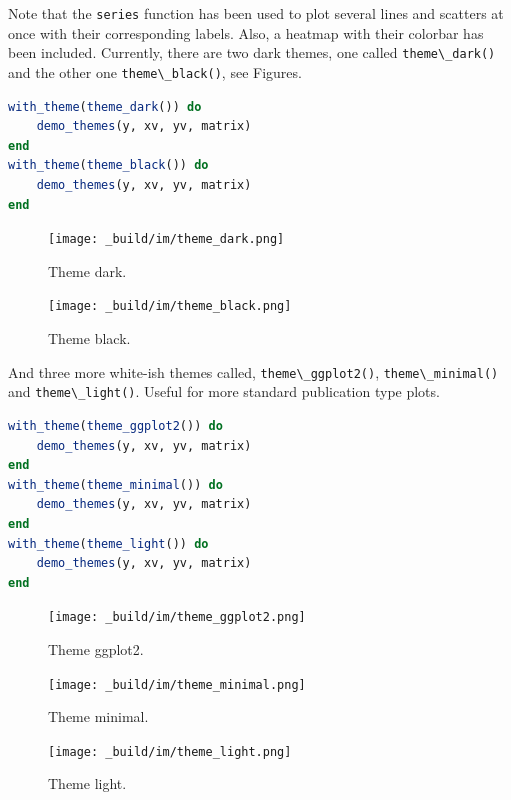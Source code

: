 \documentclass[
  notoc %
]{tufte-book}
\newcommand{\passthrough}[1]{#1}
\begin{document}
Note that the \passthrough{\lstinline!series!} function has been used to
plot several lines and scatters at once with their corresponding labels.
Also, a heatmap with their colorbar has been included. Currently, there
are two dark themes, one called \passthrough{\lstinline!theme\_dark()!}
and the other one \passthrough{\lstinline!theme\_black()!}, see Figures.

\begin{lstlisting}[language=Julia]
with_theme(theme_dark()) do
    demo_themes(y, xv, yv, matrix)
end
with_theme(theme_black()) do
    demo_themes(y, xv, yv, matrix)
end
\end{lstlisting}

\begin{figure}
\hypertarget{fig:theme_dark}{%
\centering
\texttt{[image: \_build/im/theme\_dark.png]}
\caption{Theme dark.}\label{fig:theme_dark}
}
\end{figure}

\begin{figure}
\hypertarget{fig:theme_black}{%
\centering
\texttt{[image: \_build/im/theme\_black.png]}
\caption{Theme black.}\label{fig:theme_black}
}
\end{figure}

And three more white-ish themes called,
\passthrough{\lstinline!theme\_ggplot2()!},
\passthrough{\lstinline!theme\_minimal()!} and
\passthrough{\lstinline!theme\_light()!}. Useful for more standard
publication type plots.

\begin{lstlisting}[language=Julia]
with_theme(theme_ggplot2()) do
    demo_themes(y, xv, yv, matrix)
end
with_theme(theme_minimal()) do
    demo_themes(y, xv, yv, matrix)
end
with_theme(theme_light()) do
    demo_themes(y, xv, yv, matrix)
end
\end{lstlisting}

\begin{figure}
\hypertarget{fig:theme_ggplot2}{%
\centering
\texttt{[image: \_build/im/theme\_ggplot2.png]}
\caption{Theme ggplot2.}\label{fig:theme_ggplot2}
}
\end{figure}

\begin{figure}
\hypertarget{fig:theme_minimal}{%
\centering
\texttt{[image: \_build/im/theme\_minimal.png]}
\caption{Theme minimal.}\label{fig:theme_minimal}
}
\end{figure}

\begin{figure}
\hypertarget{fig:theme_light}{%
\centering
\texttt{[image: \_build/im/theme\_light.png]}
\caption{Theme light.}\label{fig:theme_light}
}
\end{figure}
\end{document}
